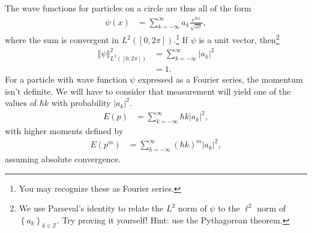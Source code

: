 \documentclass[12pt]{extarticle}
\newcommand{\Z}{\mathbb{Z}}
\newcommand{\set}[1]{\left\{#1\right\}}
\newcommand{\norm}[1]{\left\Vert #1\right\Vert}
\theoremstyle{plain}
\theoremstyle{definition}
\theoremstyle{remark}
\begin{document}
  The wave functions for particles on a circle are thus all of the form
  \begin{align*}
    \psi(x) &= \sum_{k=-\infty}^{\infty} a_k\frac{e^{ikx}}{\sqrt{2\pi}},
  \end{align*}
  where the sum is convergent in $L^{2}([0,2\pi])$.\footnote{You may recognize these as Fourier series.} If $\psi$ is a unit vector, then\footnote{We use Parseval's identity to relate the $L^{2}$ norm of $\psi$ to the $\ell^{2}$ norm of $\set{a_k}_{k\in \Z}$. Try proving it yourself! Hint: use the Pythagorean theorem.}
  \begin{align*}
    \norm{\psi}_{L^{2}([0,2\pi])}^2 &= \sum_{k=-\infty}^{\infty}|a_k|^2\\
                                    &= 1.
  \end{align*}
  For a particle with wave function $\psi$ expressed as a Fourier series, the momentum isn't definite. We will have to consider that measurement will yield one of the values of $\hbar k$ with probability $|a_k|^2$.
  \begin{align*}
    E(p) &= \sum_{k=-\infty}^{\infty}\hbar k |a_k|^2,
  \end{align*}
  with higher moments defined by
  \begin{align*}
    E(p^m) &= \sum_{k=-\infty}^{\infty}(\hbar k)^{m}|a_k|^2,
  \end{align*}
  assuming absolute convergence.
\end{document}

